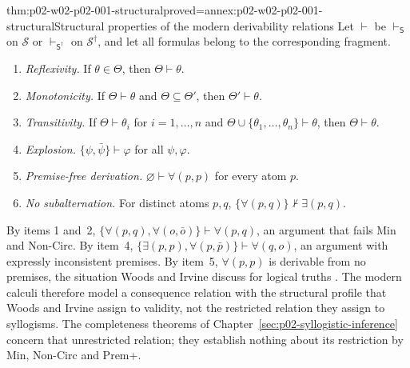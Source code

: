 \begin{hbtheorem}{thm:p02-w02-p02-001-structural}{proved=annex:p02-w02-p02-001-structural}{Structural properties of the modern derivability relations}
Let \(\vdash\) be \(\vdash_{\mathsf S}\) on \(\mathcal S\) or
\(\vdash_{\mathsf S^\dagger}\) on \(\mathcal S^\dagger\), and let all
formulas belong to the corresponding fragment.
\begin{enumerate}
\item \emph{Reflexivity.} If \(\theta\in\Theta\), then
 \(\Theta\vdash\theta\).
\item \emph{Monotonicity.} If \(\Theta\vdash\theta\) and
 \(\Theta\subseteq\Theta'\), then \(\Theta'\vdash\theta\).
\item \emph{Transitivity.} If \(\Theta\vdash\theta_i\) for
 \(i=1,\ldots,n\) and \(\Theta\cup\{\theta_1,\ldots,\theta_n\}\vdash\theta\),
 then \(\Theta\vdash\theta\).
\item \emph{Explosion.} \(\{\psi,\bar\psi\}\vdash\varphi\) for all
 \(\psi,\varphi\).
\item \emph{Premise-free derivation.} \(\varnothing\vdash\forall(p,p)\) for
 every atom \(p\).
\item \emph{No subalternation.} For distinct atoms \(p,q\),
 \(\{\forall(p,q)\}\nvdash\exists(p,q)\).
\end{enumerate}
\end{hbtheorem}

By items 1 and~2, \(\{\forall(p,q),\forall(o,\bar o)\}\vdash\forall(p,q)\),
an argument that fails Min and Non-Circ. By item~4,
\(\{\exists(p,p),\forall(p,\bar p)\}\vdash\forall(q,o)\), an argument with
expressly inconsistent premises. By item~5, \(\forall(p,p)\) is derivable
from no premises, the situation Woods and Irvine discuss for logical truths
\cite[pp.~60--62]{WoodsIrvine2004EarlyLogic}. The modern calculi
therefore model a consequence relation with the structural profile that
Woods and Irvine assign to validity, not the restricted relation they assign
to syllogisms. The completeness theorems of
Chapter~\ref{sec:p02-syllogistic-inference} concern that unrestricted
relation; they establish nothing about its restriction by Min, Non-Circ and
Prem+.
